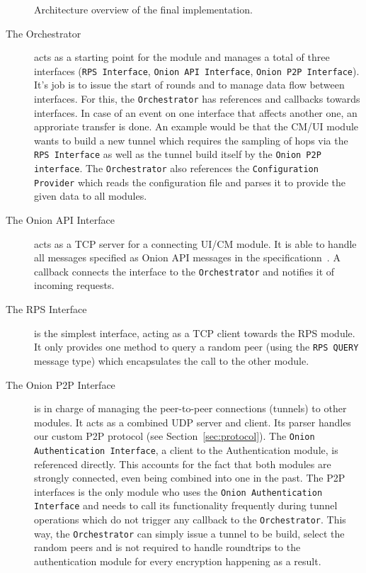 \documentclass[paper=letter, fontsize=12pt]{article}
\begin{document}
\begin{figure}[ht]
{}
    \caption{Architecture overview of the final implementation.}
    \label{fig:architecture}
\end{figure}


\begin{description}
    \item [The Orchestrator] acts as a starting point for the module and manages a total of three interfaces (\texttt{RPS Interface}, \texttt{Onion API Interface}, \texttt{Onion P2P Interface}). It's job is to issue the start of rounds and to manage data flow between interfaces. For this, the \texttt{Orchestrator} has references and callbacks towards interfaces. In case of an event on one interface that affects another one, an approriate transfer is done. An example would be that the CM/UI module wants to build a new tunnel which requires the sampling of hops via the \texttt{RPS Interface} as well as the tunnel build itself by the \texttt{Onion P2P interface}. The \texttt{Orchestrator} also references the \texttt{Configuration Provider} which reads the configuration file and parses it to provide the given data to all modules.

    \item [The Onion API Interface] acts as a TCP server for a connecting UI/CM module. It is able to handle all messages specified as Onion API messages in the specificationn~\cite{spec}.
    A callback connects the interface to the \texttt{Orchestrator} and notifies it of incoming requests.

    \item [The RPS Interface] is the simplest interface, acting as a TCP client towards the RPS module. It only provides one method to query a random peer (using the \texttt{RPS QUERY} message type) which encapsulates the call to the other module.

    \item [The Onion P2P Interface] is in charge of managing the peer-to-peer connections (tunnels) to other modules. It acts as a combined UDP server and client. Its parser handles our custom P2P protocol (see Section~\ref{sec:protocol}). The \texttt{Onion Authentication Interface}, a client to the Authentication module, is referenced directly. This accounts for the fact that both modules are strongly connected, even being combined into one in the past. The P2P interfaces is the only module who uses the \texttt{Onion Authentication Interface} and needs to call its functionality frequently during tunnel operations which do not trigger any callback to the \texttt{Orchestrator}. This way, the \texttt{Orchestrator} can simply issue a tunnel to be build, select the random peers and is not required to handle roundtrips to the authentication module for every encryption happening as a result.


\end{description}
\end{document}
